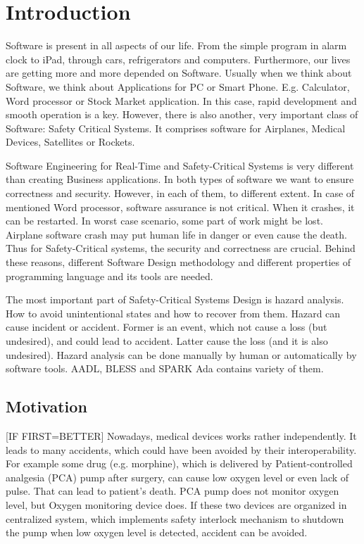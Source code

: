 
\cleardoublepage


\chapter{Introduction}
\label{introduction}

Software is present in all aspects of our life. From the simple program in alarm clock to iPad, through cars, refrigerators and computers. Furthermore, our lives are getting more and more depended on Software. Usually when we think about Software, we think about Applications for PC or Smart Phone. E.g. Calculator, Word processor or Stock Market application. In this case, rapid development and smooth operation is a key. However, there is also another, very important class of Software: Safety Critical Systems. It comprises software for Airplanes, Medical Devices, Satellites or Rockets.

Software Engineering for Real-Time and Safety-Critical Systems is very different than creating Business applications. In both types of software we want to ensure correctness and security. However, in each of them, to different extent. In case of mentioned Word processor, software assurance is not critical. When it crashes, it can be restarted. In worst case scenario, some part of work might be lost. Airplane software crash may put human life in danger or even cause the death. Thus for Safety-Critical systems, the security and correctness are crucial. Behind these reasons, different Software Design methodology and different properties of programming language and its tools are needed.

The most important part of Safety-Critical Systems Design is hazard analysis. How to avoid unintentional states and how to recover from them. Hazard can cause incident or accident. Former is an event, which not cause a loss (but undesired), and could lead to accident. Latter cause the loss (and it is also undesired). Hazard analysis can be done manually by human or automatically by software tools. AADL, BLESS and SPARK Ada contains variety of them.


\section{Motivation}
\label{introduction:motivation}

[IF FIRST=BETTER]
Nowadays, medical devices works rather independently. It leads to many accidents, which could have been avoided by their interoperability. For example some drug (e.g. morphine), which is delivered by Patient-controlled analgesia (PCA) pump after surgery, can cause low oxygen level or even lack of pulse. That can lead to patient's death. PCA pump does not monitor oxygen level, but Oxygen monitoring device does. If these two devices are organized in centralized system, which implements safety interlock mechanism to shutdown the pump when low oxygen level is detected, accident can be avoided. 

